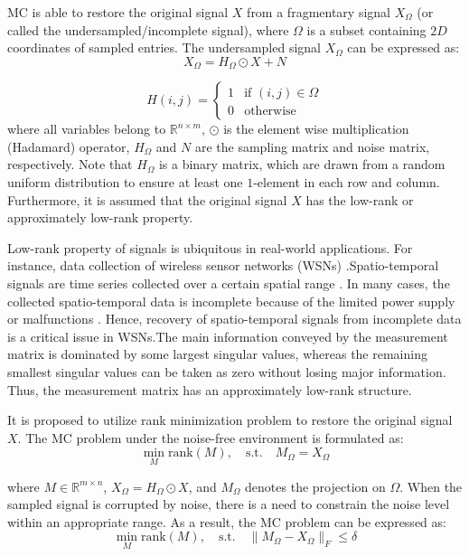 MC is able to restore the original signal $X$ from a fragmentary signal $X_{\Omega}$ (or called the undersampled/incomplete signal), where $\Omega$ is a subset containing $2D$ coordinates of sampled entries. The undersampled signal $X_{\Omega}$ can be expressed as:
\begin{equation}
    X_{\Omega} = H_{\Omega} \odot X + N \label{eq: 8}
\end{equation}

\[
H(i, j) = 
\begin{cases}
1 & \text{if } (i, j) \in \Omega \\
0 & \text{otherwise}
\end{cases}
\]
where all variables belong to $\mathbb{R}^{n \times m}$, $\odot$ is the element wise multiplication (Hadamard) operator, $H_{\Omega}$ and $N$ are the sampling matrix and noise matrix, respectively. Note that $H_{\Omega}$ is a binary matrix, which are drawn from a random uniform distribution to ensure at least one $1$-element in each row and column. Furthermore, it is assumed that the original signal $X$ has the low-rank or approximately low-rank property.

Low-rank property of signals is ubiquitous in real-world applications. For instance, data collection of wireless sensor networks (WSNs) \cite{wireless_sensor}.Spatio-temporal signals are time series collected over a certain spatial range \cite{spatial}. In many cases, the collected spatio-temporal data is incomplete because of the limited power supply or malfunctions \cite{missing_node}. Hence, recovery of spatio-temporal signals from incomplete data is a critical issue in WSNs.The main information conveyed by the measurement matrix is dominated by some largest singular values, whereas the remaining smallest singular values can be taken as zero without losing major information. Thus, the measurement matrix has an approximately low-rank structure.

It is proposed to utilize rank minimization problem to restore the original signal $X$. The MC problem under the noise-free environment is formulated as:
\begin{equation}
    \min_{M} \text{rank}(M), \quad \text{s.t.} \quad M_{\Omega} = X_{\Omega} \label{eq: 9}
\end{equation}

where $M \in \mathbb{R}^{m \times n}$, $X_{\Omega} = H_{\Omega} \odot X$, and $M_{\Omega}$ denotes the projection on $\Omega$. When the sampled signal is corrupted by noise, there is a need to constrain the noise level within an appropriate range. As a result, the MC problem can be expressed as:
\begin{equation}
    \min_{M} \text{rank}(M), \quad \text{s.t.} \quad \|M_{\Omega} - X_{\Omega}\|_F \leq \delta \label{eq: 10}
\end{equation}

